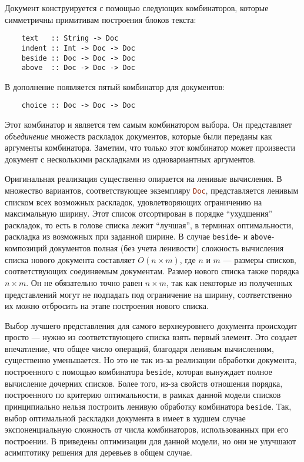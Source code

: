 Документ конструируется с помощью следующих комбинаторов, которые симметричны
примитивам построения блоков текста:
\begin{lstlisting}
    text   :: String -> Doc
    indent :: Int -> Doc -> Doc
    beside :: Doc -> Doc -> Doc
    above  :: Doc -> Doc -> Doc
\end{lstlisting}

В дополнение появляется пятый комбинатор для документов:
\begin{lstlisting}
    choice :: Doc -> Doc -> Doc
\end{lstlisting}

Этот комбинатор и является тем самым комбинатором выбора. Он представляет
\emph{объединение} множеств раскладок документов, которые были переданы как
аргументы комбинатора. Заметим, что только этот комбинатор может произвести
документ с несколькими раскладками из одновариантных аргументов.

Оригинальная реализация существенно опирается на ленивые вычисления. В \cite{swierstra}
множество вариантов, соответствующее экземпляру \lstinline[language = Haskell]{Doc},
представляется ленивым списком всех возможных раскладок, удовлетворяющих ограничению
на максимальную ширину. Этот список отсортирован в порядке ``ухудшения''
раскладок, то есть в голове списка лежит ``лучшая'', в терминах оптимальности,
раскладка из возможных при заданной ширине. В случае
\lstinline{beside}- и
\lstinline{above}-композиций
документов полная (без учета ленивости) сложность вычисления списка нового документа
составляет $O(n \times m)$, где $n$ и $m$ --- размеры списков, соответствующих 
соединяемым документам. Размер нового списка также порядка $n \times m$.
Он не обязательно точно равен $n \times m$, так как некоторые из полученных
представлений могут не подпадать под ограничение на ширину, соответственно их можно
отбросить на этапе построения нового списка.

Выбор лучшего представления для самого верхнеуровнего документа происходит
просто --- нужно из соответствующего списка взять первый элемент.
Это создает впечатление, что общее число операций,
благодаря ленивым вычислениям, существенно уменьшается.
Но это не так из-за реализации обработки документа,
построенного с помощью комбинатора \lstinline[language = Haskell]{beside}, которая
вынуждает полное вычисление дочерних списков. Более того, из-за свойств отношения
порядка, построенного по критерию оптимальности, в рамках данной модели списков
принципиально нельзя построить ленивую обработку комбинатора
\lstinline[language = Haskell]{beside}.
Так, выбор оптимальной раскладки документа в
\cite{swierstra} имеет в худшем случае экспоненциальную сложность от числа
комбинаторов, использованных при его построении.
В \cite{swiComb} приведены оптимизации для данной модели, но они
не улучшают асимптотику решения для деревьев в общем случае.

